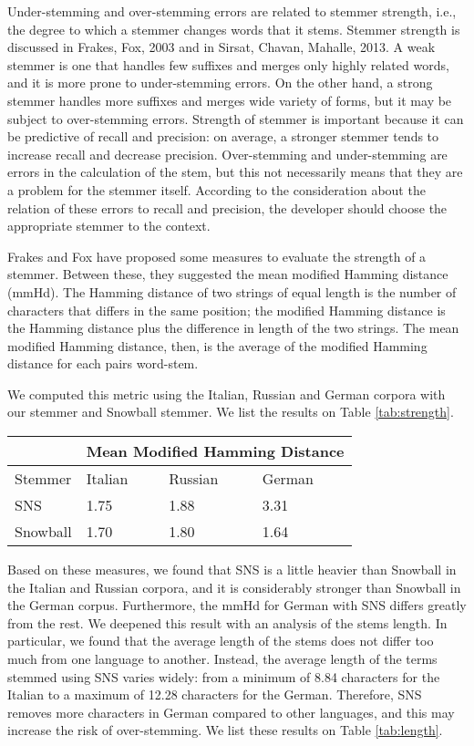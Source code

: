 Under-stemming and over-stemming errors are related to stemmer strength, i.e., the degree to which a stemmer changes words that it stems. Stemmer strength is discussed in Frakes, Fox, 2003\cite{frakes} and in Sirsat, Chavan, Mahalle, 2013\cite{sirsat}. A weak stemmer is one that handles few suffixes and merges only highly related words, and it is more prone to under-stemming errors. On the other hand, a strong stemmer handles more suffixes and merges wide variety of forms, but it may be subject to over-stemming errors. Strength of stemmer is important because it can be
predictive of recall and precision: on average, a stronger stemmer tends to increase recall and decrease precision. Over-stemming and under-stemming are errors in the calculation of the stem, but this not necessarily means that they are a problem for the stemmer itself. According to the consideration about the relation of these errors to recall and precision, the developer should choose the appropriate stemmer to the context. 

Frakes and Fox have proposed some measures to evaluate the strength of a stemmer. Between these, they suggested the mean modified Hamming distance (mmHd). The Hamming distance of two strings of equal length is the number of characters that differs in the same position; the modified Hamming distance is the Hamming distance plus the difference in length of the two strings. The mean modified Hamming distance, then, is the average of the modified Hamming distance for each pairs word-stem.

We computed this metric using the Italian, Russian and German corpora with our stemmer and Snowball stemmer. We list the results on Table \ref{tab:strength}.

\begin{center}
   \begin{tabular}{| l | l | l | l |}
    \hline
    & \multicolumn{3}{l|}{\textbf{Mean Modified Hamming Distance}}\\ \hline
    Stemmer & Italian & Russian & German\\ \hline
    SNS & 1.75 & 1.88 & 3.31 \\ \hline
    Snowball & 1.70 & 1.80 & 1.64\\ \hline    
    \end{tabular}
    \label{tab:strength}
\end{center}

Based on these measures, we found that SNS is a little heavier than Snowball in the Italian and Russian corpora, and it is considerably stronger than Snowball in the German corpus. Furthermore, the mmHd for German with SNS differs greatly from the rest. We deepened this result with an analysis of the stems length. In particular, we found that the average length of the stems does not differ too much from one language to another. Instead, the average length of the terms stemmed using SNS varies widely: from a minimum of 8.84 characters for the Italian to a maximum of 12.28 characters for the German. Therefore, SNS removes more characters in German compared to other languages, and this may increase the risk of over-stemming. We list these results on Table \ref{tab:length}.

